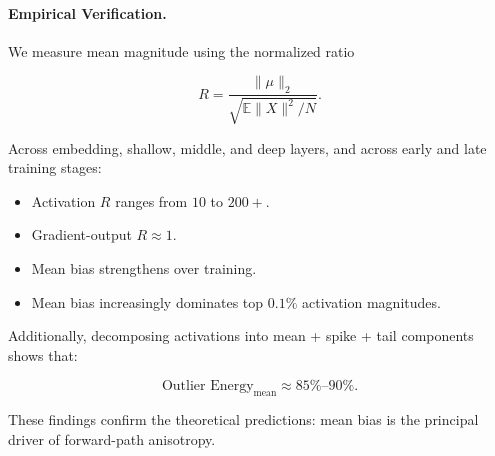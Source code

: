 \paragraph{Empirical Verification.}

We measure mean magnitude using the normalized ratio

\begin{equation}
R = \frac{\|\mu\|_2}{\sqrt{\mathbb{E}\|X\|^2/N}}.
\end{equation}

Across embedding, shallow, middle, and deep layers,
and across early and late training stages:

\begin{itemize}
\item Activation $R$ ranges from $10$ to $200+$.
\item Gradient-output $R \approx 1$.
\item Mean bias strengthens over training.
\item Mean bias increasingly dominates top $0.1\%$ activation magnitudes.
\end{itemize}

Additionally, decomposing activations into
mean + spike + tail components shows that:

\begin{equation}
\text{Outlier Energy}_{\text{mean}}
\approx
85\% \text{–} 90\%.
\end{equation}

These findings confirm the theoretical predictions:
mean bias is the principal driver of forward-path anisotropy.

